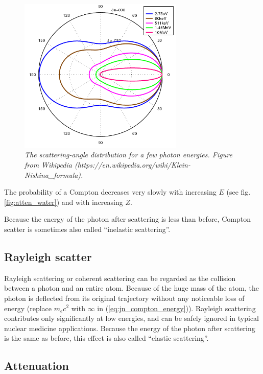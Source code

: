 \documentclass[11pt,oneside]{article}
\begin{document}
\begin{figure}[htb]
\centering
\includegraphics[bb=0 0 500 473,width=0.7\textwidth]{figs/fig_klein_nishina.png}
\caption{\label{fig:kleinnishina} \emph{The scattering-angle
    distribution for a few photon energies. Figure from Wikipedia
    (https://en.wikipedia.org/wiki/Klein-Nishina\_formula).}}
\end{figure}


The probability of a Compton decreases very slowly with increasing $E$
(see fig. \ref{fig:atten_water}) and with increasing $Z$.

Because the energy of the photon after scattering is less than before,
Compton scatter is sometimes also called ``inelastic scattering''.

\subsection{Rayleigh scatter}
Rayleigh scattering or coherent scattering can be regarded as the
collision between a photon and an entire atom. Because of the huge
mass of the atom, the photon is deflected from its original trajectory
without any noticeable loss of energy (replace $m_e c^2$ with $\infty$
in (\ref{eq:jn_compton_energy})). Rayleigh scattering contributes only
significantly at low energies, and can be safely ignored in typical nuclear
medicine applications. Because the energy of the photon after
scattering is the same as before, this effect is also called ``elastic
scattering''.

\subsection{Attenuation}
\end{document}

